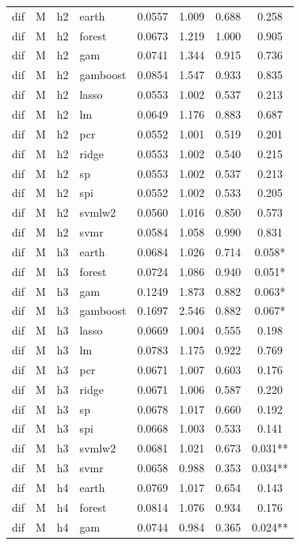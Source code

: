 \begin{ThreePartTable}
\begin{longtable}[t]{llclcccc}
dif & M & h2 & earth & 0.0557 & 1.009 & 0.688 & 0.258\\
dif & M & h2 & forest & 0.0673 & 1.219 & 1.000 & 0.905\\
dif & M & h2 & gam & 0.0741 & 1.344 & 0.915 & 0.736\\
dif & M & h2 & gamboost & 0.0854 & 1.547 & 0.933 & 0.835\\
dif & M & h2 & lasso & 0.0553 & 1.002 & 0.537 & 0.213\\
dif & M & h2 & lm & 0.0649 & 1.176 & 0.883 & 0.687\\
dif & M & h2 & pcr & 0.0552 & 1.001 & 0.519 & 0.201\\
dif & M & h2 & ridge & 0.0553 & 1.002 & 0.540 & 0.215\\
dif & M & h2 & sp & 0.0553 & 1.002 & 0.537 & 0.213\\
dif & M & h2 & spi & 0.0552 & 1.002 & 0.533 & 0.205\\
dif & M & h2 & svmlw2 & 0.0560 & 1.016 & 0.850 & 0.573\\
dif & M & h2 & svmr & 0.0584 & 1.058 & 0.990 & 0.831\\
\addlinespace
dif & M & h3 & earth & 0.0684 & 1.026 & 0.714 & 0.058*\\
dif & M & h3 & forest & 0.0724 & 1.086 & 0.940 & 0.051*\\
dif & M & h3 & gam & 0.1249 & 1.873 & 0.882 & 0.063*\\
dif & M & h3 & gamboost & 0.1697 & 2.546 & 0.882 & 0.067*\\
dif & M & h3 & lasso & 0.0669 & 1.004 & 0.555 & 0.198\\
dif & M & h3 & lm & 0.0783 & 1.175 & 0.922 & 0.769\\
dif & M & h3 & pcr & 0.0671 & 1.007 & 0.603 & 0.176\\
dif & M & h3 & ridge & 0.0671 & 1.006 & 0.587 & 0.220\\
dif & M & h3 & sp & 0.0678 & 1.017 & 0.660 & 0.192\\
dif & M & h3 & spi & 0.0668 & 1.003 & 0.533 & 0.141\\
dif & M & h3 & svmlw2 & 0.0681 & 1.021 & 0.673 & 0.031**\\
dif & M & h3 & svmr & 0.0658 & 0.988 & 0.353 & 0.034**\\
\addlinespace
dif & M & h4 & earth & 0.0769 & 1.017 & 0.654 & 0.143\\
dif & M & h4 & forest & 0.0814 & 1.076 & 0.934 & 0.176\\
dif & M & h4 & gam & 0.0744 & 0.984 & 0.365 & 0.024**\\

\end{longtable}
\end{ThreePartTable}
